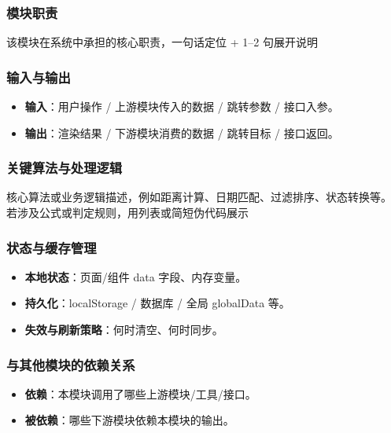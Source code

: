 \documentclass[a4paper,12pt]{article}
\begin{document}
\subsubsection{模块职责}

{{该模块在系统中承担的核心职责，一句话定位 + 1--2 句展开说明}}

\subsubsection{输入与输出}

\begin{itemize}[leftmargin=2em]
  \item \textbf{输入}：{{用户操作 / 上游模块传入的数据 / 跳转参数 / 接口入参}}。
  \item \textbf{输出}：{{渲染结果 / 下游模块消费的数据 / 跳转目标 / 接口返回}}。
\end{itemize}

\subsubsection{关键算法与处理逻辑}

{{核心算法或业务逻辑描述，例如距离计算、日期匹配、过滤排序、状态转换等。
若涉及公式或判定规则，用列表或简短伪代码展示}}

\subsubsection{状态与缓存管理}

\begin{itemize}[leftmargin=2em]
  \item \textbf{本地状态}：{{页面/组件 data 字段、内存变量}}。
  \item \textbf{持久化}：{{localStorage / 数据库 / 全局 globalData 等}}。
  \item \textbf{失效与刷新策略}：{{何时清空、何时同步}}。
\end{itemize}

\subsubsection{与其他模块的依赖关系}

\begin{itemize}[leftmargin=2em]
  \item \textbf{依赖}：{{本模块调用了哪些上游模块/工具/接口}}。
  \item \textbf{被依赖}：{{哪些下游模块依赖本模块的输出}}。
\end{itemize}
\end{document}

